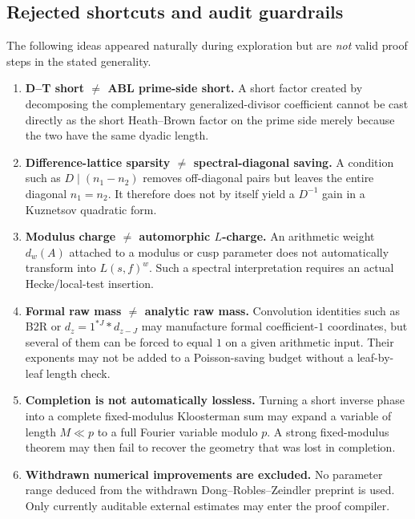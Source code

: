 \documentclass[11pt]{article}
\theoremstyle{definition}
\theoremstyle{remark}
\newcommand{\1}{\mathbf 1}
\begin{document}
\subsection{Rejected shortcuts and audit guardrails}

The following ideas appeared naturally during exploration but are \emph{not}
valid proof steps in the stated generality.

\begin{enumerate}[label=\textbf{R\arabic*.},leftmargin=3em]
\item \textbf{D--T short \(\neq\) ABL prime-side short.}
A short factor created by decomposing the complementary generalized-divisor
coefficient cannot be cast directly as the short Heath--Brown factor on the
prime side merely because the two have the same dyadic length.

\item \textbf{Difference-lattice sparsity \(\neq\) spectral-diagonal saving.}
A condition such as \(D\mid(n_1-n_2)\) removes off-diagonal pairs but leaves the
entire diagonal \(n_1=n_2\).  It therefore does not by itself yield a
\(D^{-1}\) gain in a Kuznetsov quadratic form.

\item \textbf{Modulus charge \(\neq\) automorphic \(L\)-charge.}
An arithmetic weight \(d_w(A)\) attached to a modulus or cusp parameter does not
automatically transform into \(L(s,f)^w\).  Such a spectral interpretation
requires an actual Hecke/local-test insertion.

\item \textbf{Formal raw mass \(\neq\) analytic raw mass.}
Convolution identities such as B2R or \(d_z=1^{*J}*d_{z-J}\) may manufacture
formal coefficient-\(1\) coordinates, but several of them can be forced to equal
\(1\) on a given arithmetic input.  Their exponents may not be added to a
Poisson-saving budget without a leaf-by-leaf length check.

\item \textbf{Completion is not automatically lossless.}
Turning a short inverse phase into a complete fixed-modulus Kloosterman sum may
expand a variable of length \(M\ll p\) to a full Fourier variable modulo \(p\).
A strong fixed-modulus theorem may then fail to recover the geometry that was
lost in completion.

\item \textbf{Withdrawn numerical improvements are excluded.}
No parameter range deduced from the withdrawn Dong--Robles--Zeindler preprint is
used.  Only currently auditable external estimates may enter the proof compiler.
\end{enumerate}
\end{document}

